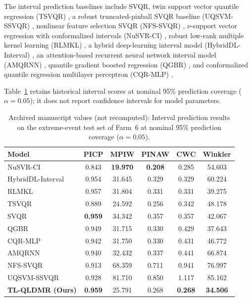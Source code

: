 The interval prediction baselines include SVQR, twin support vector quantile regression (TSVQR) \citep{tsvqr2023}, a robust truncated-pinball SVQR baseline (UQSVM-SSVQR) \citep{wang2024ssvqr}, nonlinear feature selection SVQR (NFS-SVQR) \citep{ye2025nfs}, $\nu$-support vector regression with conformalized intervals (NuSVR-CI) \citep{romano2019cqr}, robust low-rank multiple kernel learning (RLMKL) \citep{jiang2021rlmkl}, a hybrid deep-learning interval model (HybridDL-Interval) \citep{hybriddl2025}, an attention-based recurrent neural network interval model (AMQRNN) \citep{amqrnn2025}, quantile gradient boosted regression (QGBR) \citep{hu2025ncqgbr}, and conformalized quantile regression multilayer perceptron (CQR-MLP) \citep{hu2025nescqr}.

{\color{blue}Table~\ref{tab:exp3_results} retains historical interval scores at nominal 95\% prediction coverage ($\alpha=0.05$); it does not report confidence intervals for model parameters.}

\begin{table}[ht]
\centering
\caption{{\color{blue}Archived manuscript values (not recomputed): }Interval prediction results on the extreme-event test set of Farm~6 at nominal 95\% prediction coverage ($\alpha = 0.05$).}
\setlength{\tabcolsep}{4mm}
\begin{tabular}{lccccc}
\toprule
Model & PICP & MPIW & PINAW & CWC & Winkler \\
\midrule
NuSVR-CI            & 0.843 & \textbf{19.970} & \textbf{0.208} & 0.285 & 54.603 \\
HybridDL-Interval   & 0.954 & 31.645 & 0.329 & 0.329 & 60.224 \\
RLMKL               & 0.957 & 31.804 & 0.331 & 0.331 & 39.275 \\
TSVQR               & 0.889 & 24.592 & 0.256 & 0.342 & 48.178 \\
SVQR       & \textbf{0.959} & 34.342 & 0.357 & 0.357 & 42.067 \\
QGBR                & 0.949 & 31.715 & 0.330 & 0.429 & 37.643 \\
CQR-MLP             & 0.942 & 31.750 & 0.330 & 0.431 & 46.772 \\
AMQRNN              & 0.940 & 32.432 & 0.337 & 0.441 & 66.874 \\
NFS-SVQR            & 0.913 & 68.359 & 0.711 & 0.941 & 76.997 \\
UQSVM-SSVQR         & 0.928 & 81.710 & 0.850 & 1.117 & 85.162 \\
\textbf{TL-QLDMR (Ours)} & \textbf{0.959} & 25.791 & 0.268 & \textbf{0.268} & \textbf{34.506} \\
\bottomrule
\end{tabular}
\label{tab:exp3_results}
\end{table}

